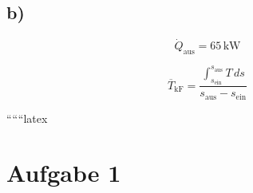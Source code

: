 

\subsection*{b)}

\[
\dot{Q}_{\text{aus}} = 65 \, \text{kW}
\]

\[
\overline{T}_{\text{kF}} = \frac{\int_{s_{\text{ein}}}^{s_{\text{aus}}} T \, ds}{s_{\text{aus}} - s_{\text{ein}}}
\]

``````latex

\section*{Aufgabe 1}
